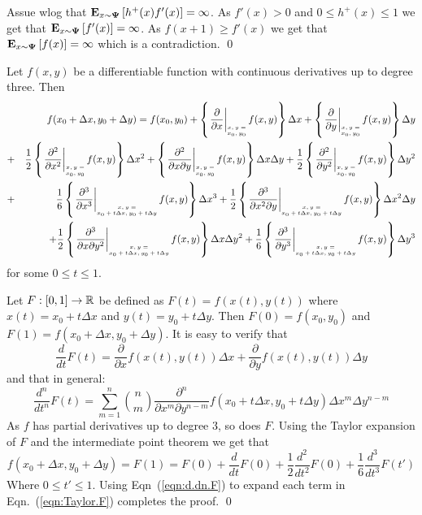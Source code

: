 \documentclass{article}[12pt]
\begin{document}
{Assue wlog that ${\bf E}_{x \sim {\bf \Psi}}\left[ h^+(x) f'(x) \right]=\infty$. As
$f'(x)>0$ and $0 \leq h^+(x) \leq 1$ we get that ${\bf E}_{x \sim
  {\bf \Psi}}\left[ f'(x) \right]=\infty$.
As $f(x+1) \geq f'(x)$ we get that ${\bf E}_{x \sim
  {\bf \Psi}}\left[ f(x) \right]=\infty$ which is a contradiction.
\qed


\newcommand{\Dx}{\Delta x}
\newcommand{\Dy}{\Delta y}
\begin{lemma} \label{lemma:Taylor2D}
Let $f(x,y)$ be a differentiable function with continuous derivatives
up to degree three. Then
\begin{eqnarray}
  &&f(x_0+\Dx,y_0+\Dy) = f(x_0,y_0)
  + \atI{\frac{\partial}{\partial x}} \Dx 
  + \atI{\frac{\partial}{\partial y}} \Dy \\
  &+&\frac{1}{2} \atI{\frac{\partial^2}{\partial x^2}} \Dx^2
      +\atI{\frac{\partial^2}{\partial x\partial y}} \Dx\Dy
      +\frac{1}{2} \atI{\frac{\partial^2}{\partial y^2}} \Dy^2\\
  &+&\frac{1}{6} \atII{\frac{\partial^3}{\partial x^3}} \Dx^3
      +\frac{1}{2} \atII{\frac{\partial^3}{\partial x^2 \partial y}} \Dx^2\Dy\\
  &&+ \frac{1}{2} \atII{\frac{\partial^3}{\partial x \partial y^2}} \Dx\Dy^2
    + \frac{1}{6} \atII{\frac{\partial^3}{\partial y^3}} \Dy^3
\end{eqnarray}
for some $0\leq t \leq 1$.
\end{lemma}
Let $F:[0,1] \to \mathbb{R}$ be defined as  $F(t)=f(x(t),y(t))$ where
$x(t) = x_0+t\Dx$ and $y(t)=y_0+t\Dy$. Then $F(0)=f(x_0,y_0)$ and
$F(1)=f(x_0+\Dx,y_0+\Dy)$. It is easy to verify that
$$ \frac{d}{dt}F(t)
=\frac{\partial}{\partial x} f(x(t),y(t))\Dx
+ \frac{\partial}{\partial y} f(x(t),y(t))\Dy
$$
and that in general:
\begin{equation} \label{eqn:d.dn.F}
\frac{d^n}{d t^n} F(t) = \sum_{m=1}^n {n \choose m}
\frac{\partial^n}{\partial x^m \partial y^{n-m}} f(x_0+t \Dx,y_0+t\Dy)
\Dx^m \Dy^{n-m}
\end{equation}
As $f$ has partial derivatives up to degree 3, so does $F$. Using the
Taylor expansion of $F$ and the intermediate point theorem we get that
\begin{equation} \label{eqn:Taylor.F}
  f(x_0+\Dx,y_0+\Dy) = F(1) = F(0)+\frac{d}{dt}F(0)
  +\frac{1}{2}\frac{d^2}{dt^2}F(0)
  +\frac{1}{6}\frac{d^3}{dt^3}F(t')
\end{equation}
Where $0 \leq t' \leq 1$. Using Eqn~(\ref{eqn:d.dn.F}) to expand each
term in Eqn.~(\ref{eqn:Taylor.F}) completes the proof.
\qed


}
\end{document}
